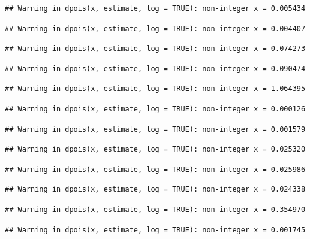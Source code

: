\documentclass[]{article}
\begin{document}
\begin{verbatim}
## Warning in dpois(x, estimate, log = TRUE): non-integer x = 0.005434
\end{verbatim}

\begin{verbatim}
## Warning in dpois(x, estimate, log = TRUE): non-integer x = 0.004407
\end{verbatim}

\begin{verbatim}
## Warning in dpois(x, estimate, log = TRUE): non-integer x = 0.074273
\end{verbatim}

\begin{verbatim}
## Warning in dpois(x, estimate, log = TRUE): non-integer x = 0.090474
\end{verbatim}

\begin{verbatim}
## Warning in dpois(x, estimate, log = TRUE): non-integer x = 1.064395
\end{verbatim}

\begin{verbatim}
## Warning in dpois(x, estimate, log = TRUE): non-integer x = 0.000126
\end{verbatim}

\begin{verbatim}
## Warning in dpois(x, estimate, log = TRUE): non-integer x = 0.001579
\end{verbatim}

\begin{verbatim}
## Warning in dpois(x, estimate, log = TRUE): non-integer x = 0.025320
\end{verbatim}

\begin{verbatim}
## Warning in dpois(x, estimate, log = TRUE): non-integer x = 0.025986
\end{verbatim}

\begin{verbatim}
## Warning in dpois(x, estimate, log = TRUE): non-integer x = 0.024338
\end{verbatim}

\begin{verbatim}
## Warning in dpois(x, estimate, log = TRUE): non-integer x = 0.354970
\end{verbatim}

\begin{verbatim}
## Warning in dpois(x, estimate, log = TRUE): non-integer x = 0.001745
\end{verbatim}
\end{document}
